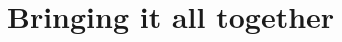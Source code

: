 \documentclass{sig-alternate-05-2015}
\begin{document}
\section{Bringing it all together}

%


\small

\end{document}
